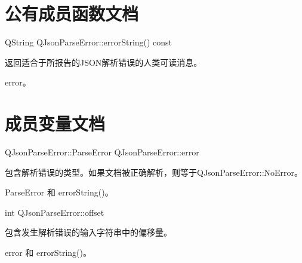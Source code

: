 \section{公有成员函数文档}

QString QJsonParseError::errorString() const

返回适合于所报告的JSON解析错误的人类可读消息。


\begin{seeAlso}
error。
\end{seeAlso}

\section{成员变量文档}

QJsonParseError::ParseError QJsonParseError::error

包含解析错误的类型。如果文档被正确解析，则等于QJsonParseError::NoError。


\begin{seeAlso}
ParseError 和 errorString()。
\end{seeAlso}

int QJsonParseError::offset

包含发生解析错误的输入字符串中的偏移量。



\begin{seeAlso}
	error 和 errorString()。
\end{seeAlso}